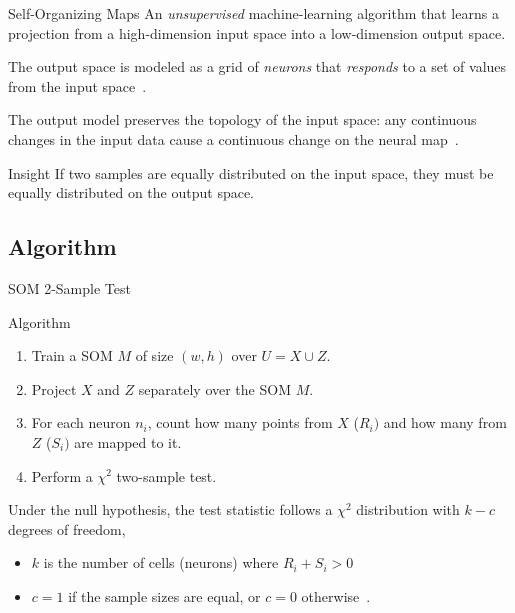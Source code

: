 \documentclass[10pt,notes]{beamer}
\begin{document}
\begin{frame}{Self-Organizing Maps}
    An \emph{unsupervised} machine-learning algorithm that learns
    a projection from a high-dimension input space into a low-dimension output space.

    \smallskip
    
    The output space is modeled as a grid of \emph{neurons} that \emph{responds} to a set of
    values from the input space~\cite{kohonen1982self}.

    \smallskip
    
    \alert{The output model preserves the topology of the input space}: any continuous changes
    in the input data cause a continuous change on the neural map~\cite{Villmann1999}.
    
    \begin{alertblock}{Insight}
        \smallskip
        If two samples are equally distributed on the input space, they must be equally distributed on the output space.
    \end{alertblock}    

\end{frame}

\subsection{Algorithm}

\begin{frame}{SOM 2-Sample Test}
    \begin{block}{Algorithm}
        \begin{enumerate}
        \item Train a SOM $M$ of size $(w, h)$ over $U = X \cup Z$.
        \item Project $X$ and $Z$ separately over the SOM  $M$.
        \item For each neuron $n_i$, count how many points from $X$ ($R_i)$ and how many from $Z$ ($S_i)$ are mapped to it.
        \item Perform a $\chi^2$ two-sample test.
        \end{enumerate}

        Under the null hypothesis, the test statistic follows a $\chi^2$ distribution with $k - c$ degrees of freedom,
        \begin{itemize}
            \item $k$ is the number of cells (neurons) where ${R_i + S_i > 0}$
            \item $c = 1$ if the sample sizes are equal, or $c = 0$ otherwise~\cite{press1993numerical}.
        \end{itemize}        
    \end{block}
\end{frame}
\end{document}
